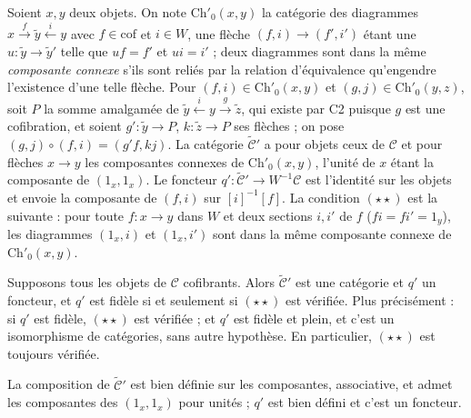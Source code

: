 \begin{definition}
Soient $x, y$ deux objets. On note $\mathrm{Ch}'_0(x, y)$ la catégorie des diagrammes $x \xrightarrow{f} \widetilde y \xleftarrow{i} y$ avec $f \in \mathrm{cof}$ et $i \in W$, une flèche $(f, i) \to (f', i')$ étant une $u : \widetilde y \to \widetilde y'$ telle que $uf = f'$ et $ui = i'$ ; deux diagrammes sont dans la même \emph{composante connexe} s'ils sont reliés par la relation d'équivalence qu'engendre l'existence d'une telle flèche. Pour $(f, i) \in \mathrm{Ch}'_0(x, y)$ et $(g, j) \in \mathrm{Ch}'_0(y, z)$, soit $P$ la somme amalgamée de $\widetilde y \xleftarrow{i} y \xrightarrow{g} \widetilde z$, qui existe par C2 puisque $g$ est une cofibration, et soient $g' : \widetilde y \to P$, $k : \widetilde z \to P$ ses flèches ; on pose $(g, j) \circ (f, i) = (g' f, k j)$. La catégorie $\widetilde{\mathcal C}'$ a pour objets ceux de $\mathcal C$ et pour flèches $x \to y$ les composantes connexes de $\mathrm{Ch}'_0(x, y)$, l'unité de $x$ étant la composante de $(1_x, 1_x)$. Le foncteur $q' : \widetilde{\mathcal C}' \to W^{-1}\mathcal C$ est l'identité sur les objets et envoie la composante de $(f, i)$ sur $[i]^{-1}[f]$. La condition $(\star\star)$ est la suivante : pour toute $f : x \to y$ dans $W$ et deux sections $i, i'$ de $f$ ($f i = f i' = 1_y$), les diagrammes $(1_x, i)$ et $(1_x, i')$ sont dans la même composante connexe de $\mathrm{Ch}'_0(x, y)$.
\end{definition}

\begin{encadre}
\begin{theoreme}
Supposons tous les objets de $\mathcal C$ cofibrants. Alors $\widetilde{\mathcal C}'$ est une catégorie et $q'$ un foncteur, et $q'$ est fidèle si et seulement si $(\star\star)$ est vérifiée. Plus précisément : si $q'$ est fidèle, $(\star\star)$ est vérifiée ; et $q'$ est fidèle et plein, et c'est un isomorphisme de catégories, sans autre hypothèse. En particulier, $(\star\star)$ est toujours vérifiée.
\end{theoreme}
\end{encadre}

\begin{lemme}\label{lem:106-cat}
La composition de $\widetilde{\mathcal C}'$ est bien définie sur les composantes, associative, et admet les composantes des $(1_x, 1_x)$ pour unités ; $q'$ est bien défini et c'est un foncteur.
\end{lemme}

